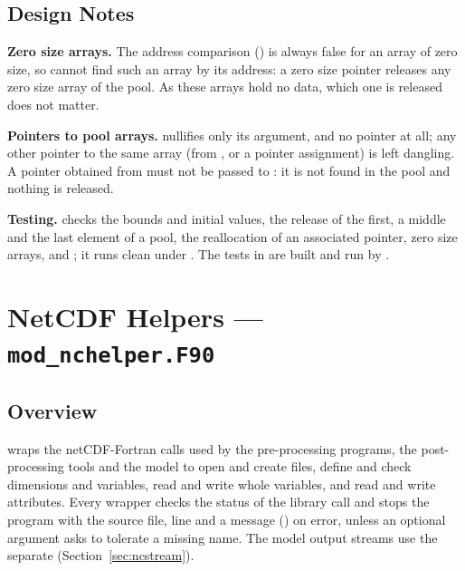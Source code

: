 \subsection{Design Notes}

\textbf{Zero size arrays.} The address comparison
() is always false for an array of zero size,
so  cannot find such an array by its address: a zero size
pointer releases any zero size array of the pool. As these arrays hold no
data, which one is released does not matter.

\textbf{Pointers to pool arrays.}  nullifies only its
argument, and  no pointer at all; any other pointer
to the same array (from , or a pointer assignment) is left
dangling. A pointer obtained from  must not be passed to
: it is not found in the pool and nothing is released.

\textbf{Testing.}  checks the bounds
and initial values, the release of the first, a middle and the last
element of a pool, the reallocation of an associated pointer, zero size
arrays,  and ; it runs clean under
. The tests in  are built and run by
.

\section{NetCDF Helpers --- \texttt{mod\_nchelper.F90}}
\label{sec:nchelper}

\subsection{Overview}

 wraps the netCDF-Fortran calls used by the
pre-processing programs, the post-processing tools and the model to open
and create files, define and check dimensions and variables, read and write
whole variables, and read and write attributes. Every wrapper checks the
status of the library call and stops the program with the source file, line
and a message () on error, unless an optional argument asks
to tolerate a missing name. The model output streams use the separate
 (Section~\ref{sec:ncstream}).

